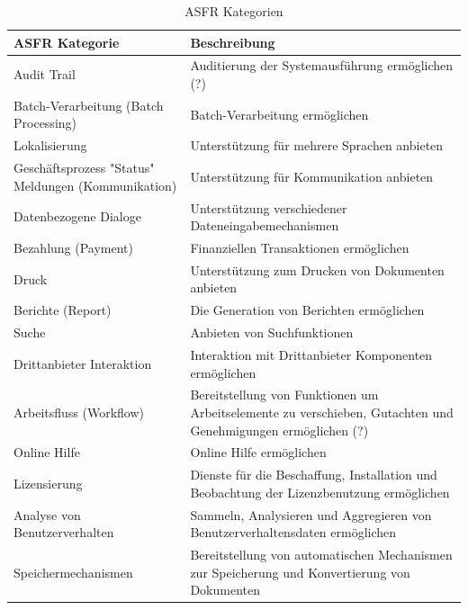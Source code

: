 \begin{table}[h] %
\caption{ASFR Kategorien \cite{Ros02}}
\centering
\begin{tabular}{|p{3cm}|p{5cm}|}
	\hline
	\textbf{ASFR Kategorie} & \textbf{Beschreibung} \\ %
	\hline
  	Audit Trail & Auditierung der Systemausf\"uhrung erm\"oglichen (?) \\%
	\hline
	Batch-Verarbeitung (Batch Processing) & Batch-Verarbeitung erm\"oglichen \\
	\hline
	Lokalisierung & Unterst\"utzung f\"ur mehrere Sprachen anbieten \\
	\hline
	Gesch\"aftsprozess "Status" Meldungen (Kommunikation) & Unterst\"utzung f\"ur Kommunikation anbieten \\
	\hline
	Datenbezogene Dialoge & Unterst\"utzung verschiedener Dateneingabemechanismen \\
	\hline
	Bezahlung (Payment) & Finanziellen Transaktionen erm\"oglichen \\
	\hline
	Druck & Unterst\"utzung zum Drucken von Dokumenten anbieten \\
	\hline
	Berichte (Report) & Die Generation von Berichten erm\"oglichen \\
	\hline
	Suche & Anbieten von Suchfunktionen \\
	\hline
	Drittanbieter Interaktion & Interaktion mit Drittanbieter Komponenten erm\"oglichen \\
	\hline
	Arbeitsfluss (Workflow) & Bereitstellung von Funktionen um Arbeitselemente zu verschieben, Gutachten und Genehmigungen erm\"oglichen (?)\\
	\hline
	Online Hilfe & Online Hilfe erm\"oglichen \\
	\hline
	Lizensierung & Dienste f\"ur die Beschaffung, Installation und Beobachtung der Lizenzbenutzung erm\"oglichen \\
	\hline
	Analyse von Benutzerverhalten & Sammeln, Analysieren und Aggregieren von Benutzerverhaltensdaten erm\"oglichen \\
	\hline
	Speichermechanismen & Bereitstellung von automatischen Mechanismen zur Speicherung und Konvertierung von Dokumenten \\
	\hline
\end{tabular}
\label{tab:asfr_category_table}
\end{table}

